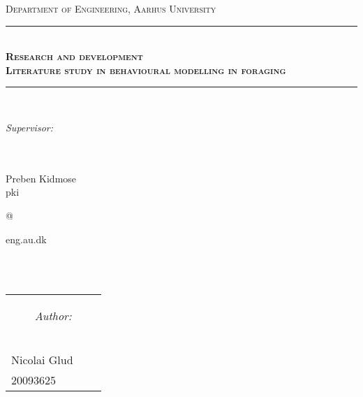 \newcommand{\HRule}{\rule{\linewidth}{0.5mm}} %

\begin{center} %
 

\textsc{\LARGE Department of Engineering, Aarhus University}\\[1.5cm] %


\HRule \\[0.4cm]
{ \Large \bfseries \textsc{Research and development}}\\[0.4cm] %
{ \huge \bfseries \textsc{Literature study in behavioural modelling in foraging}} %
\HRule \\[1.5cm]

\begin{center}
\begin{Large}\textit{Supervisor:}\end{Large}\\
\ \\
Preben Kidmose\\
pki\begin{Large}@\end{Large}eng.au.dk
\end{center}
\ \\
\ \\
\begin{table}[H]
\centering
\begin{tabular}{p{4cm} c p{4cm}}
\multicolumn{3}{c}{\begin{Large}\textit{Author:}\end{Large}}\\
\\
\\
\cline{1-1} \cline{3-3}\\
Nicolai Glud &  \\
20093625 
\end{tabular}
\end{table}
\ \\


\end{center}
